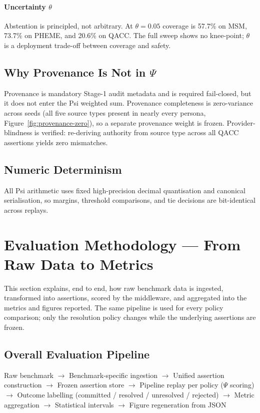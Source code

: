\documentclass[12pt,a4paper]{article}
\begin{document}
\paragraph{Uncertainty $\theta$} Abstention is principled, not arbitrary. At $\theta=0.05$ coverage is 57.7\% on MSM, 73.7\% on PHEME, and 20.6\% on QACC. The full sweep shows no knee-point; $\theta$ is a deployment trade-off between coverage and safety.

\subsection{Why Provenance Is Not in $\Psi$}
Provenance is mandatory Stage-1 audit metadata and is required fail-closed, but it does not enter the Psi weighted sum. Provenance completeness is zero-variance across seeds (all five source types present in nearly every persona, Figure~\ref{fig:provenance-zero}), so a separate provenance weight is frozen. Provider-blindness is verified: re-deriving authority from source type across all QACC assertions yields zero mismatches.

\subsection{Numeric Determinism}
All Psi arithmetic uses fixed high-precision decimal quantisation and canonical serialisation, so margins, threshold comparisons, and tie decisions are bit-identical across replays.

\section{Evaluation Methodology --- From Raw Data to Metrics}

This section explains, end to end, how raw benchmark data is ingested, transformed into assertions, scored by the middleware, and aggregated into the metrics and figures reported. The same pipeline is used for every policy comparison; only the resolution policy changes while the underlying assertions are frozen.

\subsection{Overall Evaluation Pipeline}

\begin{center}
\small Raw benchmark $\to$ Benchmark-specific ingestion $\to$ Unified assertion construction $\to$ Frozen assertion store $\to$ Pipeline replay per policy ($\Psi$ scoring) $\to$ Outcome labelling (committed / resolved / unresolved / rejected) $\to$ Metric aggregation $\to$ Statistical intervals $\to$ Figure regeneration from JSON
\end{center}
\end{document}
